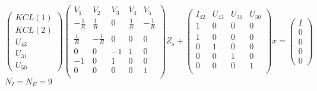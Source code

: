 \[\left(\begin{array}{c}
KCL(1)\\KCL(2)\\U_{43}\\U_{31}\\U_{50}
\end{array}\right)
\left(\begin{array}{ccccc}
V_{1}&V_{2}&V_{3}&V_{4}&V_{5}\\
  \hline
  -\frac{1}{R}&\frac{1}{R}&0&\underline{\frac{1}{R}}&\underline{-\frac{1}{R}}\\
  \frac{1}{R}&-\frac{1}{R}&0&0&0\\
  0&0&-1&1&0\\
  -1&0&1&0&0\\
  0&0&0&0&1\\
\end{array}\right)Z_{s}+
\left(\begin{array}{cccc}
  I_{42}&U_{43}&U_{31}&U_{50}\\
  \hline
  \underline{1}&0&0&0\\
  1&0&0&0\\0&1&0&0\\0&0&1&0\\0&0&0&1\\
\end{array}\right)x=
\left(\begin{array}{c}
  I\\0\\0\\0\\0
  \end{array}\right)
\]
$N_{I}=N_{E}=9$

